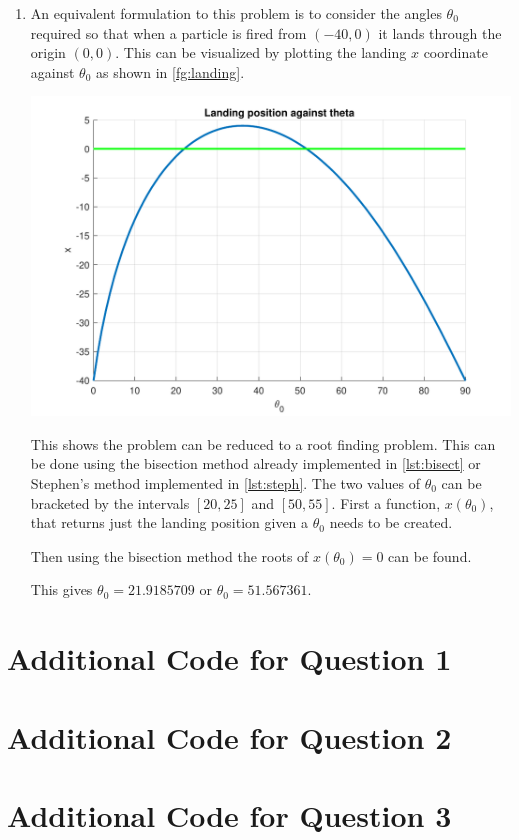 \documentclass[a4paper,11pt]{article}
\begin{document}
\begin{enumerate}
	
	\item An equivalent formulation to this problem is to consider the angles 
	$\theta_{0}$ required so that when a particle is fired from $(-40,0)$ it 
	lands through the origin $(0,0)$. This can be visualized by plotting the 
	landing $x$ coordinate against $\theta_{0}$ as shown in 
	\autoref{fg:landing}.
	\begin{center}
		\includegraphics[scale=0.7]{images/Q3f.pdf}
		\label{fg:landing}
	\end{center}
	This shows the problem can be reduced to a root finding problem. This can 
	be done using the bisection method already implemented in 
	\autoref{lst:bisect} or Stephen's method implemented in 
	\autoref{lst:steph}. The two values of $\theta_{0}$ can be bracketed by 
	the 
	intervals $[20,25]$ and $[50,55]$. First a function, $x(\theta_{0})$, 
	that 
	returns just the 
	landing 
	position given a $\theta_{0}$ needs to be created.
	
	Then using the bisection method the roots of $x(\theta_{0}) = 0$ can be 
	found.
	
	This gives $\theta_{0} = 21.9185709$ or $\theta_{0} = 51.567361$.
\end{enumerate}

\newpage
\begin{appendices}
	\section{Additional Code for Question 1}
	
	\section{Additional Code for Question 2}
	
	
	
	\section{Additional Code for Question 3}
	
	
	
\end{appendices}
\end{document}
